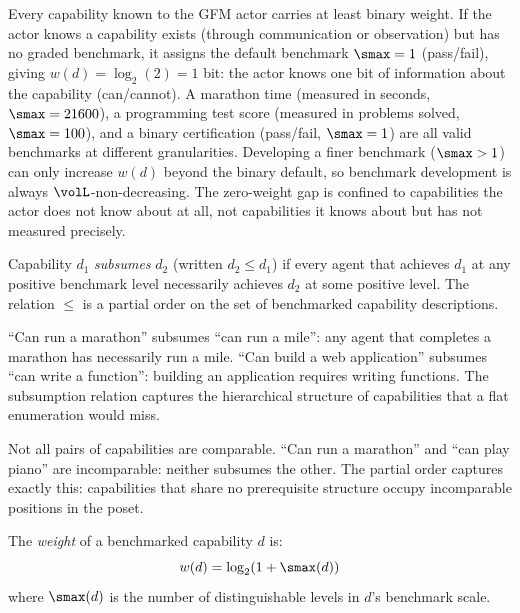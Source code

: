 Every capability known to the GFM actor carries at least binary weight. If the
actor knows a capability exists (through communication or observation) but has
no graded benchmark, it assigns the default benchmark $\smax = 1$ (pass/fail),
giving $w(d) = \log_2(2) = 1$ bit: the actor knows one bit of information
about the capability (can/cannot). A marathon time (measured in seconds, $\smax
= 21600$), a programming test score (measured in problems solved, $\smax =
100$), and a binary certification (pass/fail, $\smax = 1$) are all valid
benchmarks at different granularities. Developing a finer benchmark ($\smax >
1$) can only increase $w(d)$ beyond the binary default, so benchmark
development is always $\volL$-non-decreasing. The zero-weight gap is confined
to capabilities the actor does not know about at all, not capabilities it knows
about but has not measured precisely.


\begin{definition}[Subsumption]
\label{def:subsumption}
Capability $d_1$ \emph{subsumes} $d_2$ (written $d_2 \leq d_1$) if every
    agent that achieves $d_1$ at any positive benchmark level necessarily
    achieves $d_2$ at some positive level. The relation $\leq$ is a partial
    order on the set of benchmarked capability descriptions.
\end{definition}

``Can run a marathon'' subsumes ``can run a mile'': any agent that completes a
marathon has necessarily run a mile. ``Can build a web application'' subsumes
``can write a function'': building an application requires writing functions.
The subsumption relation captures the hierarchical structure of capabilities
that a flat enumeration would miss.

Not all pairs of capabilities are comparable. ``Can run a marathon'' and ``can
play piano'' are incomparable: neither subsumes the other. The partial order
captures exactly this: capabilities that share no prerequisite structure occupy
incomparable positions in the poset.


\begin{definition}
\label{def:weight}
The \emph{weight} of a benchmarked capability $d$ is:
\begin{equation}
\label{eq:weight}
w(d) = \log_2(1 + \smax(d))
\end{equation}
where $\smax(d)$ is the number of distinguishable levels in $d$'s benchmark
    scale.
\end{definition}

